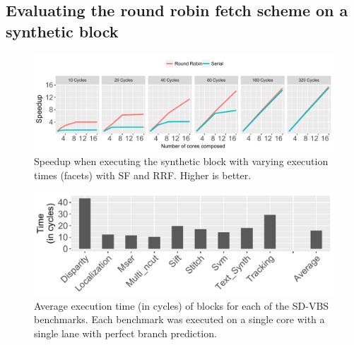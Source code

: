 
\subsection{Evaluating the round robin fetch scheme on a synthetic block}

\begin{figure}[t]
    \centering
    \includegraphics[width=1\textwidth]{chapter3/graphics/motivation_fetch.pdf}
    \caption{Speedup when executing the synthetic block with varying execution times (facets) with SF and RRF. Higher is better.}
    \label{fig:motiv_res}
\end{figure}
\begin{figure}[t]
    \centering
    \includegraphics[width=1\textwidth]{chapter3/graphics/sdvbsav.pdf}
    
	\caption{Average execution time (in cycles) of blocks for each of the SD-VBS benchmarks. Each benchmark was executed on a single core with a single lane with perfect branch prediction.}
	
    \label{fig:svdbs_av}
\vspace{1em}
\end{figure}

